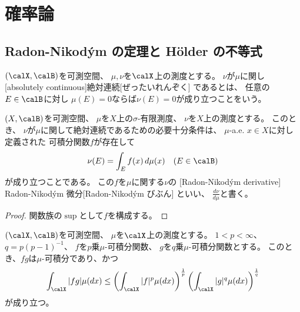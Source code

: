 \documentclass[report]{jlreq}
\begin{document}
%
\chapter{確率論}

%
\section{Radon-Nikod\'ym の定理と H\"older の不等式}


\begin{definition}[絶対連続]
    $(\calX, \calB)$を可測空間、
    $\mu, \nu$を$\calX$上の測度とする。
    $\nu$が$\mu$に関し
    [absolutely continuous]{絶対連続}[ぜったいれんぞく]
    であるとは、
    任意の$E \in \calB$に対し
    $\mu(E) = 0$ならば$\nu(E) = 0$が成り立つことをいう。
\end{definition}

\begin{theorem}
    $(X, \calB)$を可測空間、
    $\mu$を$X$上の$\sigma$-有限測度、
    $\nu$を$X$上の測度とする。
    このとき、
    $\nu$が$\mu$に関して絶対連続であるための必要十分条件は、
    $\mu$-a.e. $x \in X$に対し定義された
    可積分関数$f$が存在して
    \begin{equation}
        \nu(E) = \int_E f(x) \, d\mu(x)
            \quad
            (E \in \calB)
    \end{equation}
    が成り立つことである。
    この$f$を$\mu$に関する$\nu$の
    [Radon-Nikod\'ym derivative]
        {Radon-Nikod\'ym 微分}[Radon-Nikod\'ym びぶん]
    といい、
    $\frac{d\nu}{d\mu}$と書く。
\end{theorem}

\begin{proof}
    関数族の$\sup$として$f$を構成する。
\end{proof}

\begin{proposition}
    $(\calX, \calB)$を可測空間、
    $\mu$を$\calX$上の測度とする。
    $1 < p < \infty$、$q = p(p - 1)^{-1}$、
    $f$を$p$乗$\mu$-可積分関数、
    $g$を$q$乗$\mu$-可積分関数とする。
    このとき、$fg$は$\mu$-可積分であり、かつ
    \begin{equation}
        \int_\calX |fg| \mu(dx)
            \le \myparen{
                \int_\calX |f|^{p} \mu(dx)
            }^{\frac{1}{p}}
            \myparen{
                \int_\calX |g|^{q} \mu(dx)
            }^{\frac{1}{q}}
    \end{equation}
    が成り立つ。
\end{proposition}
\end{document}
